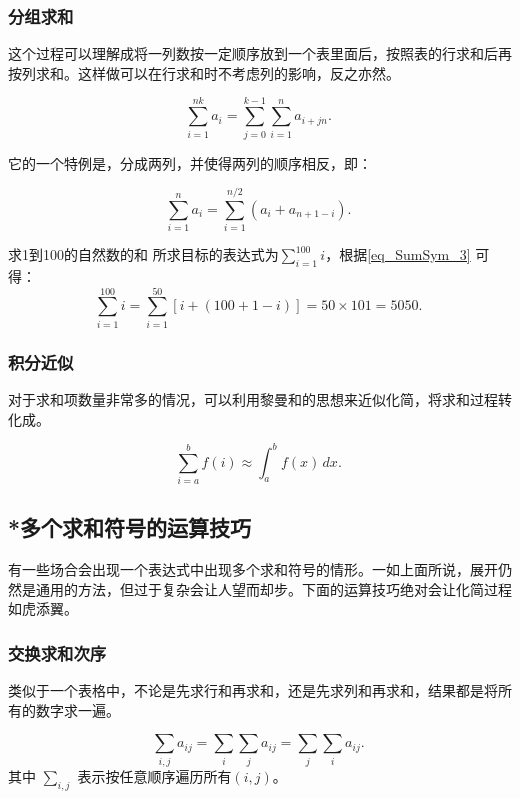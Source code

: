 \subsubsection{分组求和}

这个过程可以理解成将一列数按一定顺序放到一个表里面后，按照表的行求和后再按列求和。这样做可以在行求和时不考虑列的影响，反之亦然。

\begin{equation}
\sum_{i=1}^{nk} a_i = \sum_{j=0}^{k-1} \sum_{i=1}^n a_{i+jn}.~
\end{equation}

它的一个特例是，分成两列，并使得两列的顺序相反，即：

\begin{equation}\label{eq_SumSym_3}
\sum_{i=1}^n a_i = \sum_{i=1}^{n/2} (a_i + a_{n+1-i}).~
\end{equation}

\begin{example}{求1到100的自然数的和}
所求目标的表达式为$\sum\limits_{i=1}^{100} i$，根据\autoref{eq_SumSym_3} 可得：
$$\sum\limits_{i=1}^{100} i= \sum_{i=1}^{50} [i + (100+1-i)]=50\times101=5050.~$$
\end{example}

\subsubsection{积分近似}
对于求和项数量非常多的情况，可以利用黎曼和的思想来近似化简，将求和过程转化成。

\begin{equation}
\sum_{i=a}^b f(i) \approx \int_a^b f(x) \, dx.~
\end{equation}


\subsection{*多个求和符号的运算技巧}

有一些场合会出现一个表达式中出现多个求和符号的情形。一如上面所说，展开仍然是通用的方法，但过于复杂会让人望而却步。下面的运算技巧绝对会让化简过程如虎添翼。

\subsubsection{交换求和次序}
类似于一个表格中，不论是先求行和再求和，还是先求列和再求和，结果都是将所有的数字求一遍。

\begin{equation}
\sum_{i,j} a_{ij}=\sum_{i} \sum_{j} a_{ij} = \sum_{j} \sum_{i} a_{ij}.~
\end{equation}
其中 $\sum\limits_{i,j}$ 表示按任意顺序遍历所有$(i,j)$。


